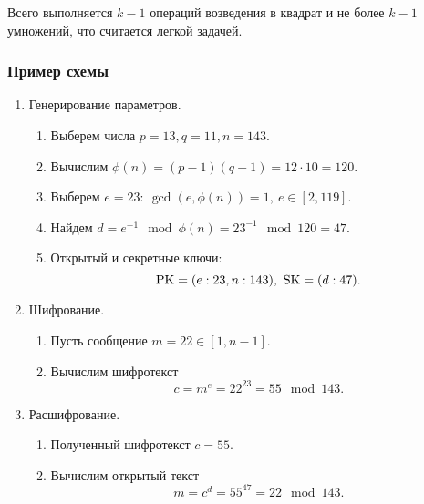 Всего выполняется  $k-1$ операций возведения в квадрат и не более $k-1$ умножений, что считается легкой задачей.


\subsubsection{Пример схемы}

\begin{enumerate}
    \item Генерирование параметров.
        \begin{enumerate}
            \item Выберем числа $p=13, q=11, n = 143$.
            \item Вычислим $\phi(n) = (p-1)(q-1) = 12 \cdot 10 = 120$.
            \item Выберем $e=23: ~ \gcd(e, \phi(n))=1, ~ e \in [2, 119]$.
            \item Найдем $d = e^{-1} \mod \phi(n) = 23^{-1} \mod 120 = 47$.
            \item Открытый и секретные ключи:
                \[ \textrm{PK} = (e:23, n:143), ~ \textrm{SK} = (d:47). \]
        \end{enumerate}
    \item Шифрование.
        \begin{enumerate}
            \item Пусть сообщение $m = 22 \in [1, n-1]$.
            \item Вычислим шифротекст
                \[ c = m^e = 22^{23} = 55 \mod 143. \]
        \end{enumerate}
    \item Расшифрование.
        \begin{enumerate}
            \item Полученный шифротекст $c = 55$.
            \item Вычислим открытый текст
                \[ m = c^d = 55^{47} = 22 \mod 143. \]
        \end{enumerate}
\end{enumerate}



